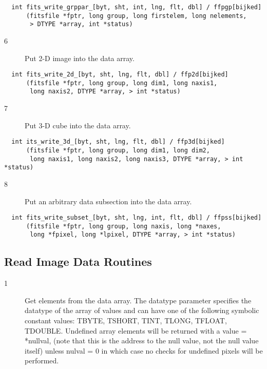 \begin{verbatim}
  int fits_write_grppar_[byt, sht, int, lng, flt, dbl] / ffpgp[bijked]
      (fitsfile *fptr, long group, long firstelem, long nelements,
       > DTYPE *array, int *status)
\end{verbatim}

\begin{description}
\item[6 ] Put 2-D image into the data array.
\end{description}

\begin{verbatim}
  int fits_write_2d_[byt, sht, lng, flt, dbl] / ffp2d[bijked]
      (fitsfile *fptr, long group, long dim1, long naxis1,
       long naxis2, DTYPE *array, > int *status)
\end{verbatim}

\begin{description}
\item[7 ] Put 3-D cube into the data array.
\end{description}

\begin{verbatim}
  int its_write_3d_[byt, sht, lng, flt, dbl] / ffp3d[bijked]
      (fitsfile *fptr, long group, long dim1, long dim2,
       long naxis1, long naxis2, long naxis3, DTYPE *array, > int *status)
\end{verbatim}

\begin{description}
\item[8 ]   Put an arbitrary data subsection into the data array.
\end{description}

\begin{verbatim}
  int fits_write_subset_[byt, sht, lng, int, flt, dbl] / ffpss[bijked]
      (fitsfile *fptr, long group, long naxis, long *naxes,
       long *fpixel, long *lpixel, DTYPE *array, > int *status)
\end{verbatim}


\subsection{ Read Image Data Routines \label{FFGPV}}


\begin{description}
\item[1 ] Get elements from the data array.  The datatype parameter specifies
    the datatype of the array of values and can have one of the following
    symbolic constant values: TBYTE, TSHORT, TINT, TLONG, TFLOAT, TDOUBLE.
    Undefined array elements will be returned with a value = *nullval,
    (note that this is the address to the null value, not the null value
    itself) unless nulval = 0 in which case no checks for undefined pixels
   will be performed.
\end{description}

